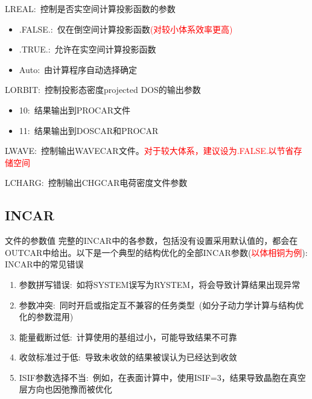 \textrm{LREAL}:~控制是否实空间计算投影函数的参数
\begin{itemize}
	\item \textrm{.FALSE.}:~仅在倒空间计算投影函数\textcolor{red}{(对较小体系效率更高)}
	\item \textrm{.TRUE.}:~允许在实空间计算投影函数
	\item \textrm{Auto}:~由计算程序自动选择确定
\end{itemize}

\textrm{LORBIT}:~控制投影态密度\textrm{projected DOS}的输出参数
\begin{itemize}
	\item 10:~结果输出到\textrm{PROCAR}文件
	\item 11:~结果输出到\textrm{DOSCAR}和\textrm{PROCAR}
\end{itemize}

\textrm{LWAVE}:~控制输出\textrm{WAVECAR}文件。\textcolor{red}{对于较大体系，建议设为\textrm{.FALSE.}以节省存储空间}

\textrm{LCHARG}:~控制输出\textrm{CHGCAR}电荷密度文件参数

\subsection{INCAR}文件的参数值
完整的\textrm{INCAR}中的各参数，包括没有设置采用默认值的，都会在\textrm{OUTCAR}中给出。以下是一个典型的结构优化的全部\textrm{INCAR}参数(\textcolor{red}{以体相铜为例}):
{\fontsize{8.2pt}{3.2pt}\selectfont{
}}
\textrm{INCAR}中的常见错误
\begin{enumerate}
	\item 参数拼写错误:~如将\textrm{SYSTEM}误写为\textrm{RYSTEM}，将会导致计算结果出现异常
	\item 参数冲突:~同时开启或指定互不兼容的任务类型~(如分子动力学计算与结构优化的参数混用)
	\item 能量截断过低:~计算使用的基组过小，可能导致结果不可靠
	\item 收敛标准过于低:~导致未收敛的结果被误认为已经达到收敛
	\item \textrm{ISIF}参数选择不当:~例如，在表面计算中，使用\textrm{ISIF=3}，结果导致晶胞在真空层方向也因弛豫而被优化
\end{enumerate}

